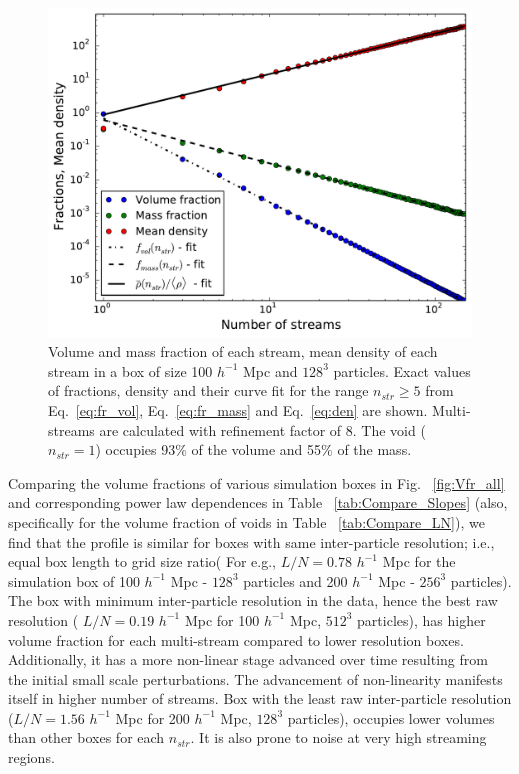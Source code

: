 \begin{figure}
\begin{minipage}[t]{.99\linewidth}
  \centering\includegraphics[width=10.cm]{Chapter3/Source_v2/fig2} 
\end{minipage}\hfill
\caption{Volume and mass fraction of each stream, mean density of each stream in a box of size 100 $h^{-1}$ Mpc and  $128^3$ particles. Exact values of fractions, density and their curve fit for the range $n_{str} \ge 5 $ from Eq.~\ref{eq:fr_vol}, Eq.~\ref{eq:fr_mass} and Eq.~\ref{eq:den} are shown. Multi-streams are calculated with refinement factor of 8. The void ($n_{str} = 1$) occupies 93$\%$ of the volume and 55$\%$ of the mass. }
\label{fig:m_v_fr}
\end{figure}

Comparing the volume fractions of various simulation boxes in Fig. ~\ref{fig:Vfr_all} and corresponding power law dependences in Table ~\ref{tab:Compare_Slopes} (also, specifically for the volume fraction of voids in Table ~\ref{tab:Compare_LN}), we find that the profile is similar for boxes with
same inter-particle resolution; i.e., equal box length to grid size ratio( For e.g., $L/N = 0.78$ $h^{-1}$ Mpc for the simulation box of 100 $h^{-1}$ Mpc - $128^3$ particles and 200 $h^{-1}$ Mpc - $256^{3}$ particles). The box with minimum inter-particle resolution in the data, hence the best raw resolution ( $L/N = 0.19$ $h^{-1}$ Mpc for 100 $h^{-1}$ Mpc, $512^3$ particles), has higher volume fraction for each multi-stream compared to lower resolution boxes. Additionally, it has a more non-linear stage advanced over time resulting from the initial small scale perturbations. The advancement of  non-linearity manifests itself in higher number of streams. Box with the least raw inter-particle resolution ($L/N = 1.56 $  $h^{-1}$ Mpc for 200 $h^{-1}$ Mpc, $128^3$ particles), occupies lower volumes than other boxes for each $n_{str}$. It is also prone to noise at very high streaming regions.

